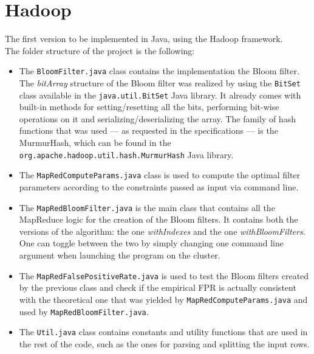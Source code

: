 %       
%
\chapter{Hadoop}\label{ch:hadoop}
The first version to be implemented in Java, using the Hadoop framework.\\
The folder structure of the project is the following:\\
\hfill \break
\begin{itemize}
\item The \texttt{BloomFilter.java} class contains the implementation the Bloom filter.\\
The \textit{bitArray} structure of the Bloom filter was realized by using the \texttt{BitSet} class available in the \texttt{java.util.BitSet} Java library. It already comes with built-in methods for setting/resetting all the bits, performing bit-wise operations on it and serializing/deserializing the array.
The family of hash functions that was used --- as requested in the specifications --- is the MurmurHash, which can be found in the \texttt{org.apache.hadoop.util.hash.MurmurHash} Java library.\\
\item The \texttt{MapRedComputeParams.java} class is used to compute the optimal filter parameters according to the constraints passed as input via command line.\\
\item The \texttt{MapRedBloomFilter.java} is the main class that contains all the MapReduce logic for the creation of the Bloom filters. It contains both the versions of the algorithm: the one \textit{withIndexes} and the one \textit{withBloomFilters}. One can toggle between the two by simply changing one command line argument when launching the program on the cluster.\\
\item The \texttt{MapRedFalsePositiveRate.java} is used to test the Bloom filters created by the previous class and check if the empirical FPR is actually consistent with the theoretical one that was yielded by \texttt{MapRedComputeParams.java} and used by \texttt{MapRedBloomFilter.java}.\\
\item The \texttt{Util.java} class contains constants and utility functions that are used in the rest of the code, such as the ones for parsing and splitting the input rows.\\
\end{itemize}
